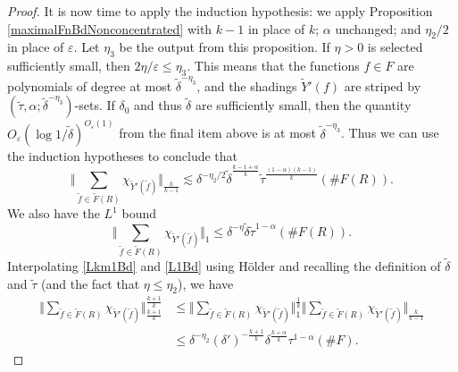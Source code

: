 \documentclass[letterpaper, reqno,11pt]{article}
\numberwithin{equation}{section}
\newcommand{\eps}{\varepsilon}
\numberwithin{thm}{section}
\theoremstyle{remark}
\begin{document}
\begin{proof}
It is now time to apply the induction hypothesis: we apply Proposition \ref{maximalFnBdNonconcentrated} with $k-1$ in place of $k$; $\alpha$ unchanged; and $\eta_2/2$ in place of $\eps$. Let $\eta_3$ be the output from this proposition. If $\eta>0$ is selected sufficiently small, then $2\eta/\eps\leq\eta_3$. This means that the functions $f\in F$ are polynomials of degree at most $\tilde\delta^{-\eta_3}$, and the shadings $\tilde Y'(f)$ are striped by $(\tilde\tau,\alpha;\tilde\delta^{-\eta_3})$-sets. If $\delta_0$ and thus $\tilde\delta$ are sufficiently small, then the quantity $O_{\eps}(\log 1/\tilde\delta)^{O_\eps(1)}$ from the final item above is at most $\tilde\delta^{-\eta_3}$. Thus we can use the induction hypotheses to conclude that 
\begin{equation}\label{Lkm1Bd}
\Big \Vert \sum_{\tilde f\in \tilde F(R) }\chi_{\tilde Y'(\tilde f)}\Big\Vert_{\frac{k}{k-1}}\lesssim \delta^{-\eta_2/2}\tilde\delta^{\frac{k-1+\alpha}{k}} \tilde\tau^{\frac{(1-\alpha)(k-1)}{k}} (\#F(R)).
\end{equation}
We also have the $L^1$ bound
\begin{equation}\label{L1Bd}
\Big \Vert \sum_{\tilde f\in \tilde F(R) }\chi_{\tilde Y'(\tilde f)}\Big\Vert_{1} \leq \delta^{-\eta}\tilde\delta\tilde\tau^{1-\alpha}(\#F(R)).
\end{equation}
Interpolating \eqref{Lkm1Bd} and \eqref{L1Bd} using H\"older and recalling the definition of $\tilde\delta$ and $\tilde\tau$ (and the fact that $\eta\leq\eta_2$), we have
\begin{equation*}
\begin{split}
\Big \Vert \sum_{\tilde f\in \tilde F(R) }\chi_{\tilde Y'(\tilde f)}\Big\Vert_{\frac{k+1}{k}}^{\frac{k+1}{k}} 
& \leq \Big \Vert \sum_{\tilde f\in \tilde F(R) }\chi_{\tilde Y'(\tilde f)}\Big\Vert_{1}^{\frac{1}{k}} \Big \Vert \sum_{\tilde f\in \tilde F(R) }\chi_{\tilde Y'(\tilde f)}\Big\Vert_{\frac{k}{k-1}}\\
& \leq \delta^{-\eta_2}(\delta')^{-\frac{k+1}{k}} \delta^{\frac{k+\alpha}{k}}\tau^{1-\alpha}(\#F).
\end{split}
\end{equation*}


\end{proof}
\end{document}

